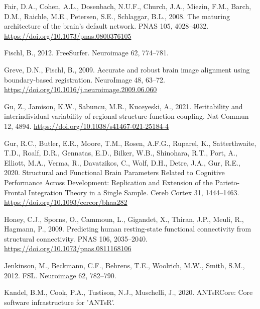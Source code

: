 \documentclass[
  12pt,
]{article}
\newlength{\cslhangindent}
\newlength{\cslentryspacingunit} %
\newenvironment{CSLReferences}[2] %
 {%
  \setlength{\parindent}{0pt}
  \ifodd #1
  \let\oldpar\par
  \def\par{\hangindent=\cslhangindent\oldpar}
  \fi
  \setlength{\parskip}{#2\cslentryspacingunit}
 }%
 {}
\begin{document}
\begin{CSLReferences}{1}{0}
\leavevmode{}%
Fair, D.A., Cohen, A.L., Dosenbach, N.U.F., Church, J.A., Miezin, F.M., Barch, D.M., Raichle, M.E., Petersen, S.E., Schlaggar, B.L., 2008. The maturing architecture of the brain's default network. PNAS 105, 4028--4032. \url{https://doi.org/10.1073/pnas.0800376105}

\leavevmode{}%
Fischl, B., 2012. FreeSurfer. Neuroimage 62, 774--781.

\leavevmode{}%
Greve, D.N., Fischl, B., 2009. Accurate and robust brain image alignment using boundary-based registration. NeuroImage 48, 63--72. \url{https://doi.org/10.1016/j.neuroimage.2009.06.060}

\leavevmode{}%
Gu, Z., Jamison, K.W., Sabuncu, M.R., Kuceyeski, A., 2021. Heritability and interindividual variability of regional structure-function coupling. Nat Commun 12, 4894. \url{https://doi.org/10.1038/s41467-021-25184-4}

\leavevmode{}%
Gur, R.C., Butler, E.R., Moore, T.M., Rosen, A.F.G., Ruparel, K., Satterthwaite, T.D., Roalf, D.R., Gennatas, E.D., Bilker, W.B., Shinohara, R.T., Port, A., Elliott, M.A., Verma, R., Davatzikos, C., Wolf, D.H., Detre, J.A., Gur, R.E., 2020. Structural and {Functional Brain Parameters Related} to {Cognitive Performance Across Development}: {Replication} and {Extension} of the {Parieto-Frontal Integration Theory} in a {Single Sample}. Cereb Cortex 31, 1444--1463. \url{https://doi.org/10.1093/cercor/bhaa282}

\leavevmode{}%
Honey, C.J., Sporns, O., Cammoun, L., Gigandet, X., Thiran, J.P., Meuli, R., Hagmann, P., 2009. Predicting human resting-state functional connectivity from structural connectivity. PNAS 106, 2035--2040. \url{https://doi.org/10.1073/pnas.0811168106}

\leavevmode{}%
Jenkinson, M., Beckmann, C.F., Behrens, T.E., Woolrich, M.W., Smith, S.M., 2012. FSL. Neuroimage 62, 782--790.

\leavevmode{}%
Kandel, B.M., Cook, P.A., Tustison, N.J., Muschelli, J., 2020. ANTsRCore: Core software infrastructure for 'ANTsR'.


\end{CSLReferences}
\end{document}
